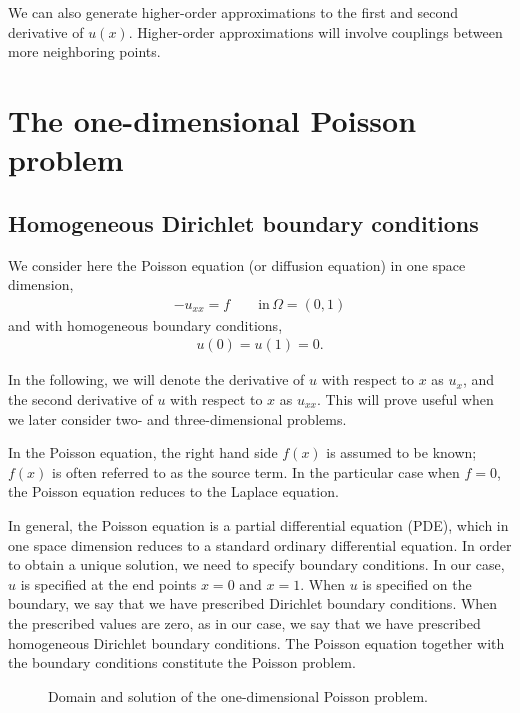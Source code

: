 We can also generate higher-order approximations to the first and second
derivative of $u(x)$. Higher-order approximations will involve couplings between
more neighboring points.

\section{The one-dimensional Poisson problem}

\subsection{Homogeneous Dirichlet boundary conditions}

We consider here the Poisson equation (or diffusion equation) in one space
dimension,
\begin{align*}
  -u_{xx} = f \qquad \text{in}\,\Omega=(0,1)
\end{align*}
and with homogeneous boundary conditions,
\begin{align*}
  u(0) = u(1) = 0.
\end{align*}

In the following, we will denote the derivative of $u$ with respect to $x$ as
$u_x$, and the second derivative of $u$ with respect to $x$ as $u_{xx}$. This
will prove useful when we later consider two- and three-dimensional problems.

In the Poisson equation, the right hand side $f(x)$ is assumed to be known;
$f(x)$ is often referred to as the source term. In the particular case when
$f=0$, the Poisson equation reduces to the Laplace equation.

In general, the Poisson equation is a partial differential equation (PDE), which
in one space dimension reduces to a standard ordinary differential equation. In
order to obtain a unique solution, we need to specify boundary conditions. In
our case, $u$ is specified at the end points $x=0$ and $x=1$. When $u$ is
specified on the boundary, we say that we have prescribed Dirichlet boundary
conditions. When the prescribed values are zero, as in our case, we say that we
have prescribed homogeneous Dirichlet boundary conditions. The Poisson equation
together with the boundary conditions constitute the Poisson problem.

\begin{figure}
  \centering
  \caption{Domain and solution of the one-dimensional Poisson problem.}
  \label{fig:Poisson1D_Domain}
\end{figure}

